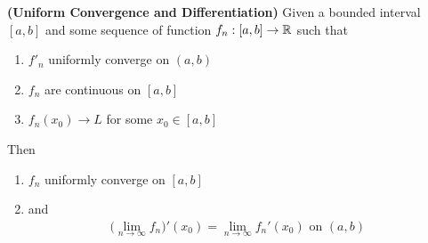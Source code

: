 \documentclass{report}
\begin{document}
\begin{theorem}
\label{UCaD}
\textbf{(Uniform Convergence and Differentiation)} Given a bounded interval $[a,b]$ and some sequence of function $f_n:[a,b]\rightarrow \mathbb{R}$ such that 
\begin{enumerate}[label=(\alph*)]
  \item $f'_n$ uniformly converge on  $(a,b)$
  \item $f_n$ are continuous on  $[a,b]$
  \item $f_n(x_0)\to L$ for some $x_0 \in [a,b]$
\end{enumerate}
Then 
\begin{enumerate}[label=(\alph*)]
  \item $f_n$ uniformly converge on  $[a,b]$ 
  \item and
\begin{align*}
\Big(\lim_{n\to \infty}f_n \Big)'(x_0)=\lim_{n\to \infty}f_n'(x_0)\text{ on $(a,b)$ }
\end{align*}
\end{enumerate}
\end{theorem}
\end{document}
